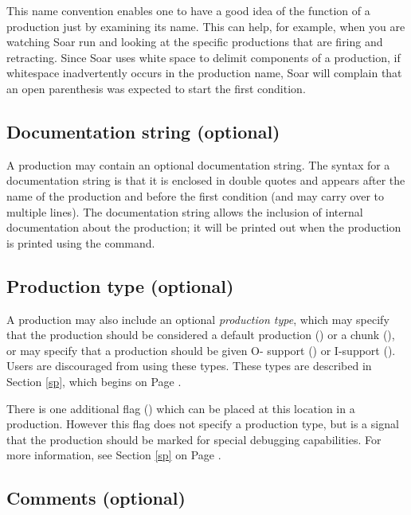 This name convention enables one to have a good idea of the function of
a production just by examining its name. This can help, for example,
when you are watching Soar run and looking at the specific productions
that are firing and retracting.  Since Soar uses white space to delimit
components of a production, if whitespace inadvertently occurs in the
production name, Soar will complain that an open parenthesis was
expected to start the first condition.

\subsection{Documentation string (optional)}

A production may contain an optional documentation string. The syntax
for a documentation string is that it is enclosed in double quotes and
appears after the name of the production and before the first condition
(and may carry over to multiple lines). The documentation string allows
the inclusion of internal documentation about the production; it will be
printed out when the production is printed using the 
command.

\subsection{Production type (optional)}

A production may also include an optional \emph{production type}, which
may specify that the production should be considered a default
production () or a chunk (), or may specify
that a production should be given O- support () or
I-support ().  Users are discouraged from using these
types.  These types are described in Section \ref{sp}, which begins on
Page \pageref{sp}.

There is one additional flag () which can be placed at this location
in a production. However this flag does not specify a production type, but is
a signal that the production should be marked for special debugging capabilities. For more
information, see Section \ref{sp} on Page \pageref{sp}.

\subsection{Comments (optional)}

